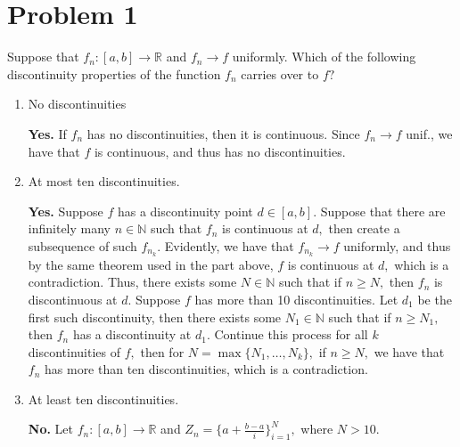\documentclass[11pt]{article}
\newcommand{\bbN}{\mathbb{N}}
\newcommand{\bbR}{\mathbb{R}}
\begin{document}
	
	
	\psetheader
\section*{Problem 1}
\begin{problem}
    Suppose that $f_n:[a,b]\to \bbR$ and $f_n \to f$ uniformly. Which of the following discontinuity properties of the function $f_n$ carries over to $f?$
\end{problem}
\begin{enumerate}
    \item 
    \begin{problem}
        No discontinuities
    \end{problem}
    \begin{solution}
        \textbf{Yes.} If $f_n$ has no discontinuities, then it is continuous. Since $f_n \to f$ unif., we have that $f$ is continuous, and thus has no discontinuities.
    \end{solution}
    \item 
    \begin{problem}
        At most ten discontinuities.
    \end{problem}
    \begin{solution}
        \textbf{Yes.} 
        Suppose $f$ has a discontinuity point $d\in [a,b].$ Suppose that there are infinitely many $n \in \bbN$ such that $f_n$ is continuous at $d,$ then create a subsequence of such $f_{n_k}.$ Evidently, we have that $f_{n_k} \to f$ uniformly, and thus by the same theorem used in the part above, $f$ is continuous at $d,$ which is a contradiction. Thus, there exists some $N\in \bbN$ such that if $n\geq N,$ then $f_n$ is discontinuous at $d.$ Suppose $f$ has more than 10 discontinuities. Let $d_1$ be the first such discontinuity, then there exists some $N_1 \in \bbN$ such that if $n\geq N_1,$ then $f_n$ has a discontinuity at $d_1.$ Continue this process for all $k$ discontinuities of $f,$ then for $N = \max\{N_1, \dots, N_k\},$ if $n\geq N,$ we have that $f_n$ has more than ten discontinuities, which is a contradiction.
    \end{solution}
    \item 
    \begin{problem}
        At least ten discontinuities.
    \end{problem}
    \begin{solution}
        \textbf{No.} Let $f_n: [a,b]\to \bbR$ and $Z_n = \{a + \frac{b-a}{i}\}_{i=1}^{N},$ where $N>10.$

\end{solution}
\end{enumerate}
\end{document}
